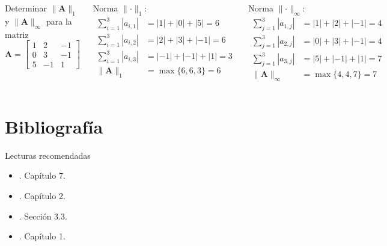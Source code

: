 \documentclass[9pt, aspectratio=169]{beamer}
\begin{document}
\begin{frame}
\begin{columns}[t]
\cx
Determinar $\lVert \bm{A} \rVert_{1}$ y $\lVert \bm{A} \rVert_{\infty}$ para la matriz
\[ \bm{A} = \begin{bmatrix}
    1 & 2 & -1 \\
    0 & 3 & -1 \\
    5 & -1 & 1
\end{bmatrix} \]

Norma $\lVert \cdot \rVert_1$:
\begin{align*}
    \sum_{i=1}^3 |a_{i,1}| &= |1| + |0| + |5| = 6 \\
    \sum_{i=1}^3 |a_{i,2}| &= |2| + |3| + |-1| = 6 \\
    \sum_{i=1}^3 |a_{i,3}| &= |-1| + |-1| + |1| = 3 \\
    \lVert \bm{A} \rVert_1 &= \max \{6, 6, 3\} = 6
\end{align*}

\cx
Norma $\lVert \cdot \rVert_{\infty}$: 
\begin{align*}
    \sum_{j=1}^3 |a_{1,j}| &= |1| + |2| + |-1| = 4 \\
    \sum_{j=1}^3 |a_{2,j}| &= |0| + |3| + |-1| = 4 \\
    \sum_{j=1}^3 |a_{3,j}| &= |5| + |-1| + |1| = 7 \\
    \lVert \bm{A} \rVert_{\infty} &= \max \{4, 4, 7\} = 7
\end{align*}

\end{columns}
\end{frame}

\section*{Bibliografía}
\begin{frame}[allowframebreaks]{Lecturas recomendadas}
\begin{itemize}
    \item {}. Capítulo 7.
    \item {}. Capítulo 2.
    \item {}. Sección 3.3.
    \item {}. Capítulo 1.
\end{itemize}
\end{frame}
\end{document}
